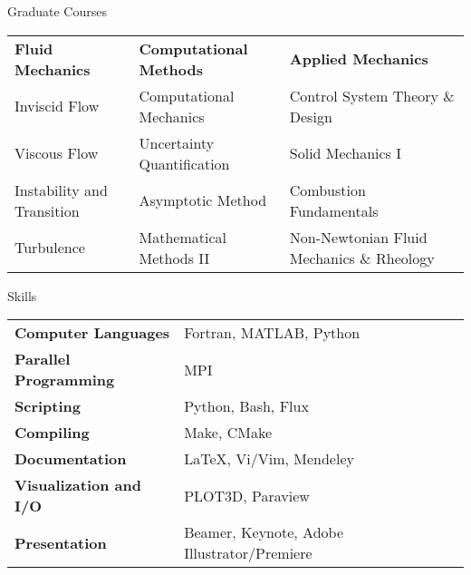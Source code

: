 \documentclass{resume} %
\begin{document}
\begin{rSection}{Graduate Courses}
\hspace{-.7cm}
\begin{tabular}{p{4.5cm}p{5cm}l}
\textbf{Fluid Mechanics} & \textbf{Computational Methods} & \textbf{Applied Mechanics}\\
Inviscid Flow & Computational Mechanics & Control System Theory \& Design \\
Viscous Flow & Uncertainty Quantification &  Solid Mechanics I \\
Instability and Transition & Asymptotic Method & Combustion Fundamentals \\
Turbulence & Mathematical Methods II & Non-Newtonian Fluid Mechanics \& Rheology
\end{tabular}

\end{rSection}


\begin{rSection}{Skills}

\begin{tabular}{ @{} >{\bfseries}l @{\hspace{6ex}} l }
Computer Languages &  Fortran, MATLAB, Python\\%
Parallel Programming & MPI \\
Scripting & Python, Bash, Flux \\
Compiling & Make, CMake \\
Documentation & \LaTeX, Vi/Vim, Mendeley \\
Visualization and I/O & PLOT3D, Paraview \\
Presentation & Beamer, Keynote, Adobe Illustrator/Premiere \\
\end{tabular}

\end{rSection}
\end{document}
